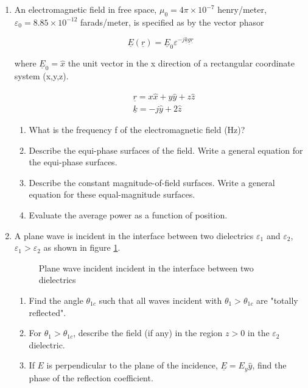 \documentclass[main.tex]{subfiles}
\begin{document}
\begin{enumerate}
\item An electromagnetic field in free space, $\mu_{0}=4 \pi \times 10^{-7}$ henry/meter, $\varepsilon_0 = 8.85 \times 10^{-12}$ farads/meter, is specified as by the vector phasor 

$$\underline{E}(\underline{r})=\underline{E}_{0} \varepsilon^{-j \underline{k} \underline{g} \underline{r}}$$

where $\underline{E}_{0}=\hat{x}$ the unit vector in the x direction of a rectangular coordinate system (x,y,z).

$$\begin{aligned}
&\underline{r}=x \hat{x}+y \hat{y}+z \hat{z} \\
&\underline{k}=-j \hat{y}+2 \hat{z}
\end{aligned}$$

    \begin{enumerate}
        \item What is the frequency f of the electromagnetic field (Hz)?
        \item Describe the equi-phase surfaces of the field. Write a general equation for the equi-phase surfaces.
        \item Describe the constant magnitude-of-field surfaces. Write a general equation for these equal-magnitude surfaces.
        \item Evaluate the average power as a function of position.
    \end{enumerate}

\item A plane wave is incident in the interface between two dielectrics $\varepsilon_1$ and $\varepsilon_2$, $\varepsilon_1 > \varepsilon_2$ as shown in figure \ref{fig:12q_a}.

\begin{figure}
\centering{}
\caption{Plane wave incident incident in the interface between two dielectrics}
\label{fig:12q_a}
\end{figure}

    \begin{enumerate}
        \item Find the angle $\theta_{1c}$ such that all waves incident with $\theta_1 > \theta_{1c}$ are "totally reflected".
        \item For $\theta_1 > \theta_{1c}$, describe the field (if any) in the region $z > 0$ in the $\varepsilon_2$ dielectric.
        \item If \underline{$E$} is perpendicular to the plane of the incidence, $\underline{E} = E_y \hat{y}$, find the phase of the reflection coefficient.
    \end{enumerate}


\end{enumerate}
\end{document}
